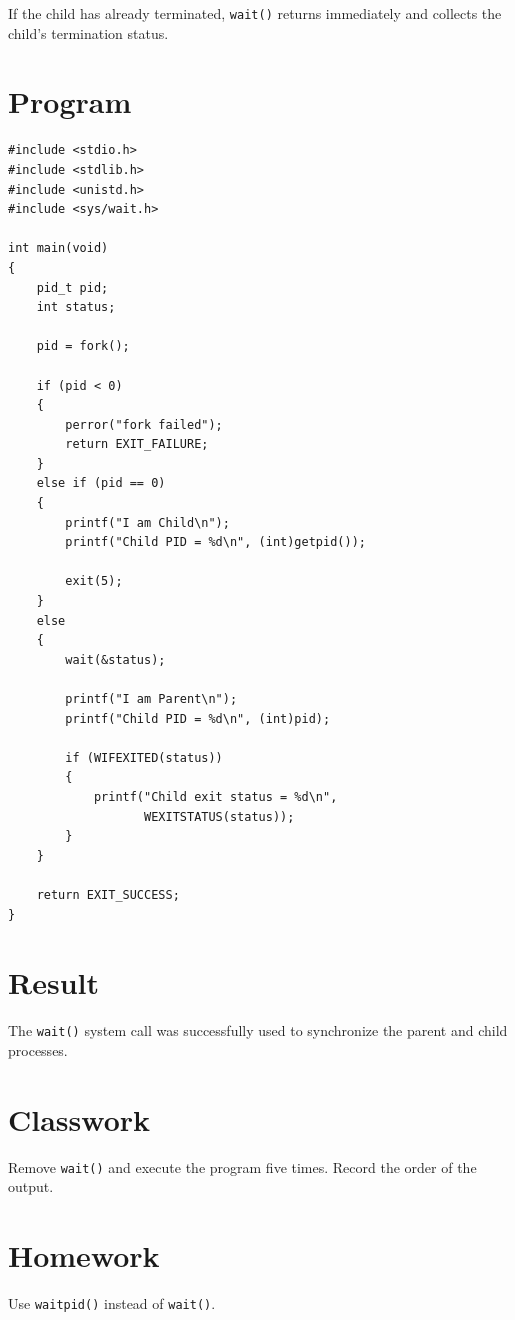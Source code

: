 \documentclass[12pt,a4paper]{report}
\begin{document}
If the child has already terminated, \texttt{wait()} returns immediately and
collects the child's termination status.

\section*{Program}

\begin{lstlisting}
#include <stdio.h>
#include <stdlib.h>
#include <unistd.h>
#include <sys/wait.h>

int main(void)
{
    pid_t pid;
    int status;

    pid = fork();

    if (pid < 0)
    {
        perror("fork failed");
        return EXIT_FAILURE;
    }
    else if (pid == 0)
    {
        printf("I am Child\n");
        printf("Child PID = %d\n", (int)getpid());

        exit(5);
    }
    else
    {
        wait(&status);

        printf("I am Parent\n");
        printf("Child PID = %d\n", (int)pid);

        if (WIFEXITED(status))
        {
            printf("Child exit status = %d\n",
                   WEXITSTATUS(status));
        }
    }

    return EXIT_SUCCESS;
}
\end{lstlisting}

\section*{Result}

The \texttt{wait()} system call was successfully used to synchronize the parent
and child processes.

\section*{Classwork}

Remove \texttt{wait()} and execute the program five times. Record the order of
the output.

\section*{Homework}

Use \texttt{waitpid()} instead of \texttt{wait()}.

\end{document}
